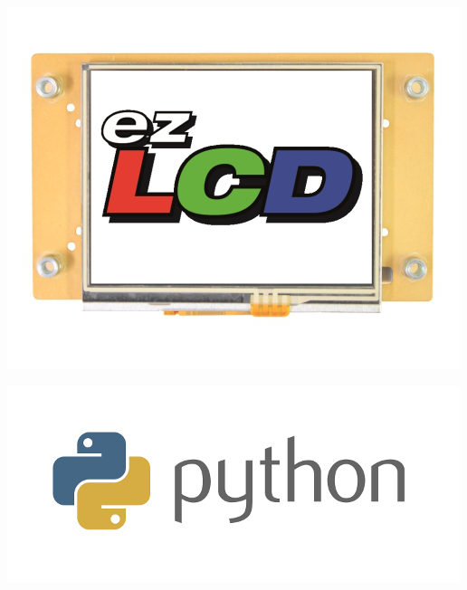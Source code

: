  
\begin{DoxyImageNoCaption}
  \mbox{\includegraphics{ezLCD-303Front.png}}
\end{DoxyImageNoCaption}
 
\begin{DoxyImageNoCaption}
  \mbox{\includegraphics{python.png}}
\end{DoxyImageNoCaption}
 